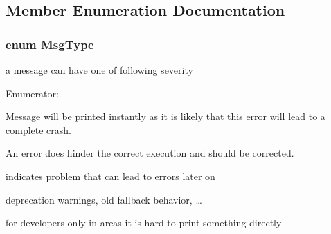 \subsection{\-Member \-Enumeration \-Documentation}
\subsubsection[{\-Msg\-Type}]{\setlength{\rightskip}{0pt plus 5cm}enum {\bf \-Msg\-Type}}\label{classGlobalError_a2ea0bb09adcce7f655e8f8ee8d30561b}


a message can have one of following severity 

\begin{Desc}
\item[\-Enumerator\-: ]\par
\begin{description}
\item[{\em 
\-F\-A\-T\-A\-L\label{classGlobalError_a2ea0bb09adcce7f655e8f8ee8d30561ba651d8a47a6976d6fe05c0e03fb4cd2d0}
}]\-Message will be printed instantly as it is likely that this error will lead to a complete crash. \item[{\em 
\-E\-R\-R\-O\-R\label{classGlobalError_a2ea0bb09adcce7f655e8f8ee8d30561ba2fd6f336d08340583bd620a7f5694c90}
}]\-An error does hinder the correct execution and should be corrected. \item[{\em 
\-W\-A\-R\-N\-I\-N\-G\label{classGlobalError_a2ea0bb09adcce7f655e8f8ee8d30561ba984de77c680eaff141ec910e25568a81}
}]indicates problem that can lead to errors later on \item[{\em 
\-N\-O\-T\-I\-C\-E\label{classGlobalError_a2ea0bb09adcce7f655e8f8ee8d30561baed8762ff982b982ce3d67f81ab34f1d4}
}]deprecation warnings, old fallback behavior, … \item[{\em 
\-D\-E\-B\-U\-G\label{classGlobalError_a2ea0bb09adcce7f655e8f8ee8d30561ba0593585da9181e972974c1274d8f2b4f}
}]for developers only in areas it is hard to print something directly \end{description}
\end{Desc}



